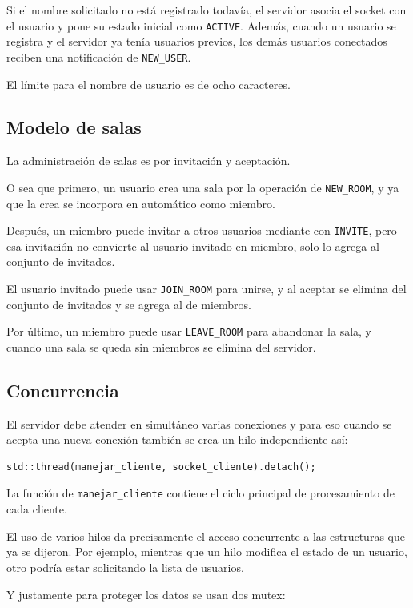 \documentclass[12pt,letterpaper]{article}
\begin{document}
Si el nombre solicitado no está registrado todavía, el servidor asocia el socket
con el usuario y pone su estado inicial como \texttt{ACTIVE}. Además,
cuando un usuario se registra y el servidor ya tenía usuarios previos, los demás usuarios conectados reciben una notificación de
\texttt{NEW\_USER}.

El límite para el nombre de usuario es de ocho caracteres.

\subsection{Modelo de salas}

La administración de salas es por invitación y aceptación.

O sea que primero, un usuario crea una sala por la operación de \texttt{NEW\_ROOM}, y ya que la crea se incorpora en automático como miembro.

Después, un miembro puede invitar a otros usuarios mediante con \texttt{INVITE}, pero esa invitación no convierte al usuario invitado en
miembro, solo lo agrega al conjunto de invitados.

El usuario invitado puede usar \texttt{JOIN\_ROOM} para unirse, y al aceptar
se elimina del conjunto de invitados y se agrega al de miembros.

Por último, un miembro puede usar \texttt{LEAVE\_ROOM} para abandonar
la sala, y cuando una sala se queda sin miembros se elimina del servidor.

\subsection{Concurrencia}

El servidor debe atender en simultáneo varias conexiones y para eso cuando se acepta una nueva conexión también se crea un hilo independiente así:

\begin{lstlisting}[style=cppstyle]
std::thread(manejar_cliente, socket_cliente).detach();
\end{lstlisting}

La función de \texttt{manejar\_cliente} contiene el ciclo principal de
procesamiento de cada cliente.

El uso de varios hilos da precisamente el acceso concurrente a las estructuras que ya se dijeron. Por ejemplo, mientras que un hilo modifica el estado de un usuario,
otro podría estar solicitando la lista de usuarios.

Y justamente para proteger los datos se usan dos mutex:
\end{document}
